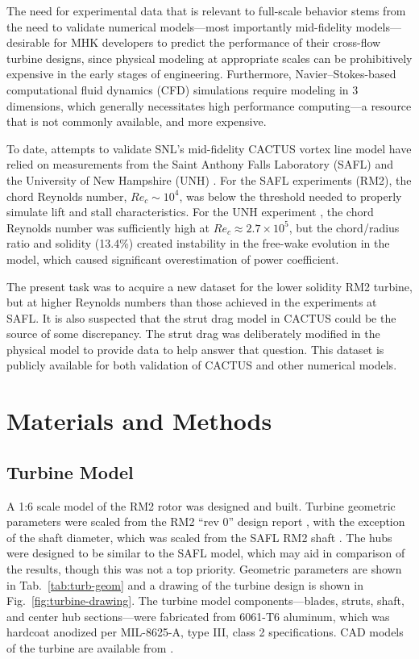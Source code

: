 \documentclass[10pt,letterpaper]{article}
\begin{document}
The need for experimental data that is relevant to full-scale behavior stems
from the need to validate numerical models---most importantly mid-fidelity
models---desirable for MHK developers to predict the performance of their
cross-flow turbine designs, since physical modeling at appropriate scales can be
prohibitively expensive in the early stages of engineering. Furthermore,
Navier--Stokes-based computational fluid dynamics (CFD) simulations require
modeling in 3 dimensions, which generally necessitates high performance
computing---a resource that is not commonly available, and more expensive.

To date, attempts to validate SNL's mid-fidelity CACTUS vortex line model
\cite{Murray2011} have relied on measurements from the Saint Anthony Falls
Laboratory (SAFL) \cite{Hill2014} and the University of New Hampshire (UNH)
\cite{Neary2013, Michelen2014}. For the SAFL experiments (RM2), the chord
Reynolds number, $Re_c \sim 10^4$, was below the threshold needed to properly
simulate lift and stall characteristics. For the UNH experiment
\cite{Bachant2013}, the chord Reynolds number was sufficiently high at $Re_c
\approx 2.7 \times 10^5$, but the chord/radius ratio and solidity (13.4\%)
created instability in the free-wake evolution in the model, which caused
significant overestimation of power coefficient.

The present task was to acquire a new dataset for the lower solidity RM2
turbine, but at higher Reynolds numbers than those achieved in the experiments
at SAFL. It is also suspected that the strut drag model in CACTUS could be the
source of some discrepancy. The strut drag was deliberately modified in the
physical model to provide data to help answer that question. This dataset is
publicly available for both validation of CACTUS and other numerical models.


\section*{Materials and Methods}

\subsection*{Turbine Model}


A 1:6 scale model of the RM2 rotor was designed and built. Turbine geometric
parameters were scaled from the RM2 ``rev 0'' design report \cite{Barone2011},
with the exception of the shaft diameter, which was scaled from the SAFL RM2
shaft \cite{Hill2014}. The hubs were designed to be similar to the SAFL model,
which may aid in comparison of the results, though this was not a top priority.
Geometric parameters are shown in Tab.~\ref{tab:turb-geom} and a drawing of the
turbine design is shown in Fig.~\ref{fig:turbine-drawing}. The turbine model
components---blades, struts, shaft, and center hub sections---were fabricated
from 6061-T6 aluminum, which was hardcoat anodized per MIL-8625-A, type III,
class 2 specifications. CAD models of the turbine are available from
\cite{Bachant2015-RM2-CAD}.
\end{document}
